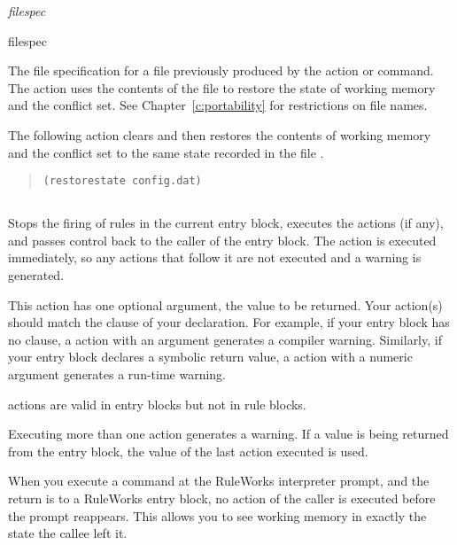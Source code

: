 {{\Format

 \it{filespec}

\begin{arguments}
\item[filespec]

  The file specification for a file previously produced by the
   action or command. The action uses the contents of
  the file to restore the state of working memory and the conflict
  set. See Chapter~\ref{c:portability} for restrictions on file names.
\end{arguments}

\Example

The following action clears and then restores the contents of working
memory and the conflict set to the same state recorded in the file
.

\begin{quote}
\begin{verbatim}
(restorestate config.dat)
\end{verbatim}
\end{quote}

\subsection{}

Stops the firing of rules in the current entry block, executes the
 actions (if any), and passes control back to the caller
of the entry block. The  action is executed immediately, so
any actions that follow it are not executed and a warning is
generated.

This action has one optional argument, the value to be returned. Your
 action(s) should match the  clause of your
 declaration. For example, if your entry block has no
 clause, a  action with an argument generates a
compiler warning. Similarly, if your entry block declares a symbolic
return value, a  action with a numeric argument generates a
run-time warning.

 actions are valid in entry blocks but not in rule blocks.

Executing more than one  action generates a warning. If
a value is being returned from the entry block, the value of
the last  action executed is used.

When you execute a  command at the RuleWorks interpreter
prompt, and the return is to a RuleWorks entry block, no action of the
caller is executed before the prompt reappears. This allows you to see
working memory in exactly the state the callee left it.

}}
